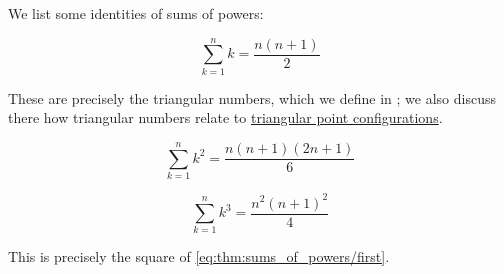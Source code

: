 \begin{proposition}\label{thm:sums_of_powers}
  We list some identities of sums of powers:
  \begin{thmenum}
    \begin{equation}\label{eq:thm:sums_of_powers/first}
      \sum_{k=1}^n k = \frac {n (n+1)} 2
    \end{equation}

    These are precisely the triangular numbers, which we define in ; we also discuss there how triangular numbers relate to \hyperref[def:triangular_point_configuration]{triangular point configurations}.

    \begin{equation}\label{eq:thm:sums_of_powers/second}
      \sum_{k=1}^n k^2 = \frac {n (n+1) (2n + 1)} 6
    \end{equation}

    \begin{equation}\label{eq:thm:sums_of_powers/third}
      \sum_{k=1}^n k^3 = \frac {n^2 (n+1)^2} 4
    \end{equation}

    This is precisely the square of \eqref{eq:thm:sums_of_powers/first}.
  \end{thmenum}
\end{proposition}
